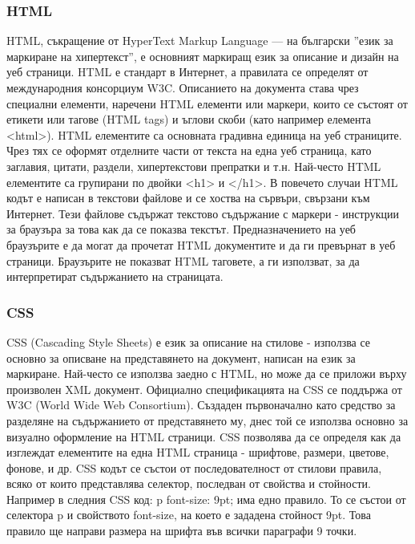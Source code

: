\documentclass[pdftex,14pt,a4paper]{extreport}
\begin{document}
\subsubsection {HTML}
HTML, съкращение от HyperText Markup Language — на български ''език за маркиране на хипертекст'', е основният маркиращ език за описание и дизайн на уеб страници. HTML е стандарт в Интернет, а правилата се определят от международния консорциум W3C. Описанието на документа става чрез специални елементи, наречени HTML елементи или маркери, които се състоят от етикети или тагове (HTML tags) и ъглови скоби (като например елемента <html>). HTML елементите са основната градивна единица на уеб страниците. Чрез тях се оформят отделните части от текста на една уеб страница, като заглавия, цитати, раздели, хипертекстови препратки и т.н. Най-често HTML елементите са групирани по двойки <h1> и </h1>.
В повечето случаи HTML кодът е написан в текстови файлове и се хоства на сървъри, свързани към Интернет. Тези файлове съдържат текстово съдържание с маркери - инструкции за браузъра за това как да се показва текстът. Предназначението на уеб браузърите е да могат да прочетат HTML документите и да ги превърнат в уеб страници. Браузърите не показват HTML таговете, а ги използват, за да интерпретират съдържанието на страницата.
\subsubsection {CSS}
CSS (Cascading Style Sheets) е език за описание на стилове - използва се основно за описване на представянето на документ, написан на език за маркиране. Най-често се използва заедно с HTML, но може да се приложи върху произволен XML документ. Официално спецификацията на CSS се поддържа от W3C (World Wide Web Consortium). Създаден първоначално като средство за разделяне на съдържанието от представянето му, днес той се използва основно за визуално оформление на HTML страници.
CSS позволява да се определя как да изглеждат елементите на една HTML страница - шрифтове, размери, цветове, фонове, и др. CSS кодът се състои от последователност от стилови правила, всяко от които представлява селектор, последван от свойства и стойности. Например в следния CSS код:
p {font-size: 9pt;} има едно правило. То се състои от селектора p и свойството font-size, на което е зададена стойност 9pt. Това правило ще направи размера на шрифта във всички параграфи 9 точки.
\end{document}
